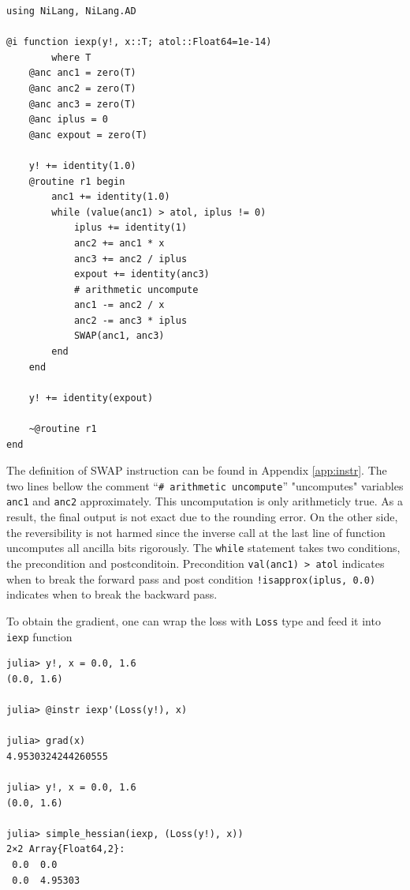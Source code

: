 \documentclass[aps,twocolumn,longbibliography,english,superscriptaddress,prr]{revtex4-1}
\newcommand{\<}{\langle}
\renewcommand{\>}{\rangle}
\newcommand{\App}[1]{Appendix \ref{#1}}
\theoremstyle{definition}\newtheorem{definition}{\textit{Definition}}
\begin{document}
\begin{minipage}{.44\textwidth}
\begin{lstlisting}
using NiLang, NiLang.AD

@i function iexp(y!, x::T; atol::Float64=1e-14)
        where T
    @anc anc1 = zero(T)
    @anc anc2 = zero(T)
    @anc anc3 = zero(T)
    @anc iplus = 0
    @anc expout = zero(T)

    y! += identity(1.0)
    @routine r1 begin
        anc1 += identity(1.0)
        while (value(anc1) > atol, iplus != 0)
            iplus += identity(1)
            anc2 += anc1 * x
            anc3 += anc2 / iplus
            expout += identity(anc3)
            # arithmetic uncompute
            anc1 -= anc2 / x
            anc2 -= anc3 * iplus
            SWAP(anc1, anc3)
        end
    end

    y! += identity(expout)

    ~@routine r1
end
\end{lstlisting}
\end{minipage}

The definition of SWAP instruction can be found in \App{app:instr}.
The two lines bellow the comment ``\texttt{\# arithmetic uncompute}'' "uncomputes" variables \texttt{anc1} and \texttt{anc2} approximately. This uncomputation is only arithmeticly true. As a result, the final output is not exact due to the rounding error. On the other side, the reversibility is not harmed since the inverse call at the last line of function uncomputes all ancilla bits rigorously.
The \texttt{while} statement takes two conditions, the precondition and postconditoin. Precondition \texttt{val(anc1) > atol} indicates when to break the forward pass and post condition \texttt{!isapprox(iplus, 0.0)} indicates when to break the backward pass.

To obtain the gradient, one can wrap the loss with \texttt{Loss} type and feed it into \texttt{iexp\textquotesingle} function

\begin{minipage}{.44\textwidth}
\begin{lstlisting}
julia> y!, x = 0.0, 1.6
(0.0, 1.6)

julia> @instr iexp'(Loss(y!), x)

julia> grad(x)
4.9530324244260555

julia> y!, x = 0.0, 1.6
(0.0, 1.6)

julia> simple_hessian(iexp, (Loss(y!), x))
2×2 Array{Float64,2}:
 0.0  0.0
 0.0  4.95303
\end{lstlisting}
\end{minipage}
\end{document}
